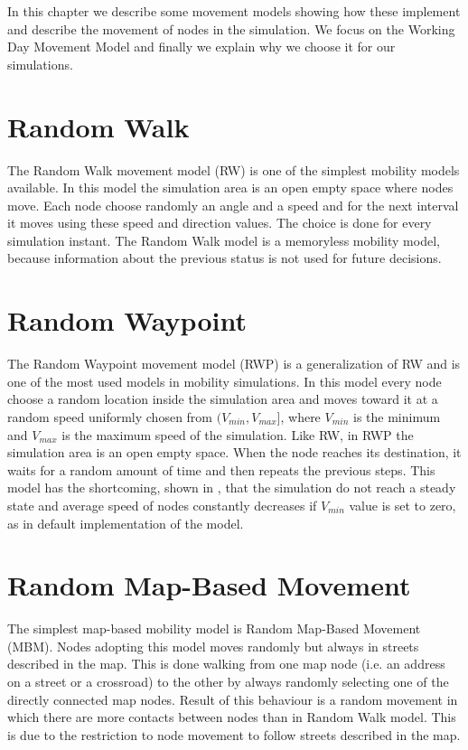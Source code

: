 In this chapter we describe some movement models showing how these implement and describe the movement of nodes in the simulation. We focus on the Working Day Movement Model and finally we explain why we choose it for our simulations.


\section{Random Walk}
The Random Walk movement model (RW) is one of the simplest mobility models available. In this model the simulation area is an open empty space where nodes move. Each node choose randomly an angle and a speed and for the next interval it moves using these speed and direction values. The choice is done for every simulation instant. The Random Walk model is a memoryless mobility model, because information about the previous status is not used for future decisions. 


\section{Random Waypoint}
The Random Waypoint movement model (RWP) is a generalization of RW and is one of the most used models in mobility simulations. In this model every node choose a random location inside the simulation area and moves toward it at a random speed uniformly chosen from $(V_{min}, V_{max}]$, where $V_{min}$ is the minimum and $V_{max}$ is the maximum speed of the simulation. Like RW, in RWP the simulation area is an open empty space. When the node reaches its destination, it waits for a random amount of time and then repeats the previous steps. This model has the shortcoming, shown in \cite{rwpharmful}, that the simulation do not reach a steady state and average speed of nodes constantly decreases if $V_{min}$ value is set to zero, as in default implementation of the model. 


\section{Random Map-Based Movement}
The simplest map-based mobility model is Random Map-Based Movement (MBM). Nodes adopting this model moves randomly but always in streets described in the map. This is done walking from one map node (i.e. an address on a street or a crossroad) to the other by always randomly selecting one of the directly connected map nodes. Result of this behaviour is a random movement in which there are more contacts between nodes than in Random Walk model. This is due to the restriction to node movement to follow streets described in the map.



